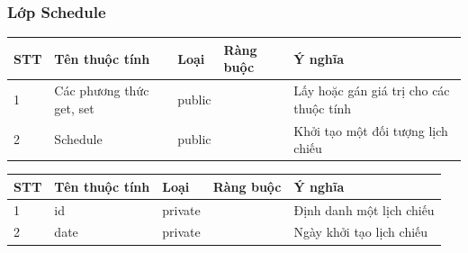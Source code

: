 \documentclass[a4paper, 12pt]{article}
\begin{document}
\subsubsection{Lớp Schedule}
\begin{table}[H]
\centering
\begin{tabular}{|l|l|l|l|l|}
\hline
STT & Tên thuộc tính           & Loại   & Ràng buộc & Ý nghĩa                                 \\ \hline
1   & Các phương thức get, set & public &           & Lấy hoặc gán giá trị cho các thuộc tính \\ \hline
2   & Schedule                 & public &           & Khởi tạo một đối tượng lịch chiếu       \\ \hline
\end{tabular}
\end{table}

\begin{table}[H]
\centering
\begin{tabular}{|l|l|l|l|l|}
\hline
STT & Tên thuộc tính  & Loại    & Ràng buộc & Ý nghĩa                  \\ \hline
1   & id              & private &           & Định danh một lịch chiếu \\ \hline
2   & date            & private &           & Ngày khởi tạo lịch chiếu \\ \hline
\end{tabular}
\end{table}
\end{document}

